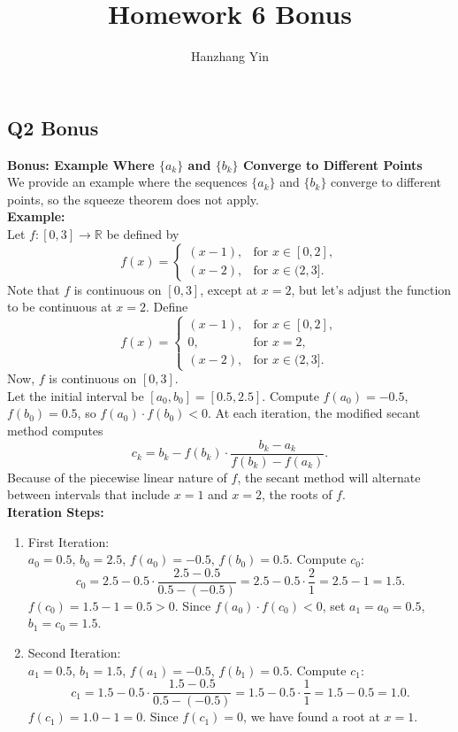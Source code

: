 \documentclass{article}
\title{\vspace{-4em}Homework 6 Bonus}
\author{Hanzhang Yin}
\begin{document}
\maketitle

\subsection*{Q2 Bonus}

\textbf{Bonus: Example Where \( \{ a_k \} \) and \( \{ b_k \} \) Converge to Different Points}
\\
We provide an example where the sequences \( \{ a_k \} \) and \( \{ b_k \} \) converge to different points, so the squeeze theorem does not apply.
\\
\textbf{Example:}
\\
Let \( f: [0, 3] \to \mathbb{R} \) be defined by
\[
f(x) = \begin{cases}
(x - 1), & \text{for } x \in [0, 2], \\
(x - 2), & \text{for } x \in (2, 3].
\end{cases}
\]
Note that \( f \) is continuous on \( [0, 3] \), except at \( x = 2 \), but let's adjust the function to be continuous at \( x = 2 \). Define
\[
f(x) = \begin{cases}
(x - 1), & \text{for } x \in [0, 2], \\
0, & \text{for } x = 2, \\
(x - 2), & \text{for } x \in (2, 3].
\end{cases}
\]
Now, \( f \) is continuous on \( [0, 3] \).
\\
Let the initial interval be \( [a_0, b_0] = [0.5, 2.5] \).
Compute \( f(a_0) = -0.5 \), \( f(b_0) = 0.5 \), so \( f(a_0) \cdot f(b_0) < 0 \).
At each iteration, the modified secant method computes
\[
c_k = b_k - f(b_k) \cdot \frac{b_k - a_k}{f(b_k) - f(a_k)}.
\]
Because of the piecewise linear nature of \( f \), the secant method will alternate between intervals that include \( x = 1 \) and \( x = 2 \), the roots of \( f \).
\\
\textbf{Iteration Steps:}

\begin{enumerate}
  \item First Iteration:
  \\
  \( a_0 = 0.5 \), \( b_0 = 2.5 \), \( f(a_0) = -0.5 \), \( f(b_0) = 0.5 \).
  Compute \( c_0 \):
  \[
    c_0 = 2.5 - 0.5 \cdot \frac{2.5 - 0.5}{0.5 - (-0.5)} = 2.5 - 0.5 \cdot \frac{2}{1} = 2.5 - 1 = 1.5.
  \]
  \( f(c_0) = 1.5 - 1 = 0.5 > 0 \). Since \( f(a_0) \cdot f(c_0) < 0 \), set \( a_1 = a_0 = 0.5 \), \( b_1 = c_0 = 1.5 \).
  \item Second Iteration:
  \\
  \( a_1 = 0.5 \), \( b_1 = 1.5 \), \( f(a_1) = -0.5 \), \( f(b_1) = 0.5 \).
  Compute \( c_1 \):
  \[
    c_1 = 1.5 - 0.5 \cdot \frac{1.5 - 0.5}{0.5 - (-0.5)} = 1.5 - 0.5 \cdot \frac{1}{1} = 1.5 - 0.5 = 1.0.
  \]
  \( f(c_1) = 1.0 - 1 = 0 \). Since \( f(c_1) = 0 \), we have found a root at \( x = 1 \).
\end{enumerate}
\end{document}
